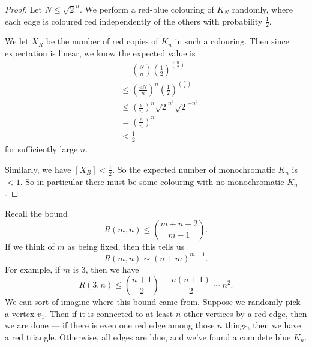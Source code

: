 \documentclass[a4paper]{article}
\begin{document}
\begin{proof}
  Let $N \leq \sqrt{2}^n$. We perform a red-blue colouring of $K_N$ randomly, where each edge is coloured red independently of the others with probability $\frac{1}{2}$.

  We let $X_R$ be the number of red copies of $K_n$ in such a colouring. Then since expectation is linear, we know the expected value is
  \begin{align*}
    [X_R] &= \binom{N}{n} \left(\frac{1}{2}\right)^{\binom{n}{2}}\\
          &\leq \left(\frac{eN}{n}\right)^n \left(\frac{1}{2}\right)^{\binom{n}{2}}\\
          &\leq \left(\frac{e}{n}\right)^n \sqrt{2}^{n^2} \sqrt{2}^{-n^2}\\
          &= \left(\frac{e}{n}\right)^{n}\\
          &< \frac{1}{2}
  \end{align*}
  for sufficiently large $n$.

  Similarly, we have $[X_B] < \frac{1}{2}$. So the expected number of monochromatic $K_n$ is $< 1$. So in particular there must be some colouring with no monochromatic $K_n$.
\end{proof}

Recall the bound
\[
  R(m, n) \leq \binom{m + n - 2}{m - 1}.
\]
If we think of $m$ as being fixed, then this tells us
\[
  R(m, n) \sim (n + m)^{m - 1}.
\]
For example, if $m$ is $3$, then we have
\[
  R(3, n) \leq \binom{n + 1}{2} = \frac{n(n + 1)}{2} \sim n^2.
\]
We can sort-of imagine where this bound came from. Suppose we randomly pick a vertex $v_1$. Then if it is connected to at least $n$ other vertices by a red edge, then we are done --- if there is even one red edge among those $n$ things, then we have a red triangle. Otherwise, all edges are blue, and we've found a complete blue $K_n$.
\end{document}
